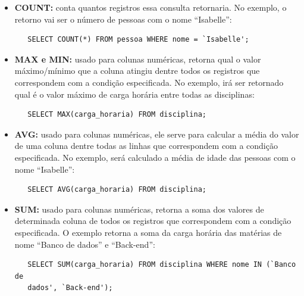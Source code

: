 \documentclass[
	12pt,				%
	openright,			%
	oneside,			%
	a4paper,			%
	english,			%
	french,				%
	spanish,			%
	brazil,				%
	]{abntex2}
\begin{document}
\begin{itemize}
   \item \textbf{COUNT: } conta quantos registros essa consulta retornaria. No exemplo, o retorno vai ser o número de pessoas com o nome ``Isabelle'':
   \begin{verbatim}
   SELECT COUNT(*) FROM pessoa WHERE nome = `Isabelle';
   \end{verbatim}
   
   \item \textbf{MAX e MIN: } usado para colunas numéricas, retorna qual o valor máximo/mínimo que a coluna atingiu dentre todos os registros que correspondem com a condição especificada. No exemplo, irá ser retornado qual é o valor máximo de carga horária entre todas as disciplinas:
   \begin{verbatim}
   SELECT MAX(carga_horaria) FROM disciplina;
   \end{verbatim}
   
   \item \textbf{AVG: } usado para colunas numéricas, ele serve para calcular a média do valor de uma coluna dentre todas as linhas que correspondem com a condição especificada. No exemplo, será calculado a média de idade das pessoas com o nome ``Isabelle'':
   \begin{verbatim}
   SELECT AVG(carga_horaria) FROM disciplina;
   \end{verbatim}
   
   \item \textbf{SUM: } usado para colunas numéricas, retorna a soma dos valores de determinada coluna de todos os registros que correspondem com a condição especificada. O exemplo retorna a soma da carga horária das matérias de nome ``Banco de dados'' e ``Back-end'':
   \begin{verbatim}
   SELECT SUM(carga_horaria) FROM disciplina WHERE nome IN (`Banco de 
   dados', `Back-end');
   \end{verbatim}
\end{itemize}

% 

\postextual



\end{document}

